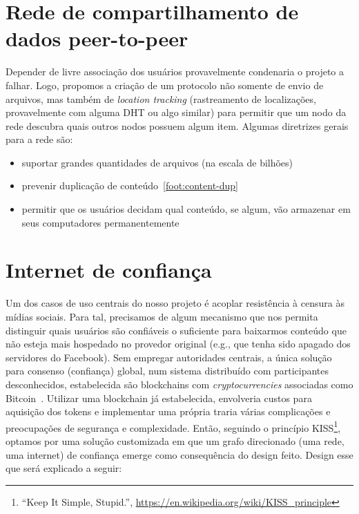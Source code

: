 \section{Rede de compartilhamento de dados peer-to-peer}

Depender de livre associação dos usuários provavelmente condenaria o projeto a falhar.
Logo, propomos a criação de um protocolo não somente de envio de arquivos, mas também de \textit{location tracking} (rastreamento de localizações, provavelmente com alguma DHT ou algo similar) para permitir que um nodo da rede descubra quais outros nodos possuem algum item.
Algumas diretrizes gerais para a rede são:
\begin{itemize}
    \item suportar grandes quantidades de arquivos (na escala de bilhões)
    \item prevenir duplicação de conteúdo~\ref{foot:content-dup}
    \item permitir que os usuários decidam qual conteúdo, se algum, vão armazenar em seus computadores permanentemente
\end{itemize}

\section{Internet de confiança\label{sec:int-of-trust}}

Um dos casos de uso centrais do nosso projeto é acoplar resistência à censura às mídias sociais.
Para tal, precisamos de algum mecanismo que nos permita distinguir quais usuários são confiáveis o suficiente para baixarmos conteúdo que não esteja mais hospedado no provedor original (e.g., que tenha sido apagado dos servidores do Facebook).
Sem empregar autoridades centrais, a única solução para consenso (confiança) global, num sistema distribuído com participantes desconhecidos, estabelecida são blockchains com \textit{cryptocurrencies} associadas como Bitcoin~\cite{nakamoto2008bitcoin}.
Utilizar uma blockchain já estabelecida, envolveria custos para aquisição dos tokens e implementar uma própria traria várias complicações e preocupações de segurança e complexidade.
Então, seguindo o princípio KISS\footnote{``Keep It Simple, Stupid.'', \url{https://en.wikipedia.org/wiki/KISS_principle}}, optamos por uma solução customizada em que um grafo direcionado (uma rede, uma internet) de confiança emerge como consequência do design feito.
Design esse que será explicado a seguir:

